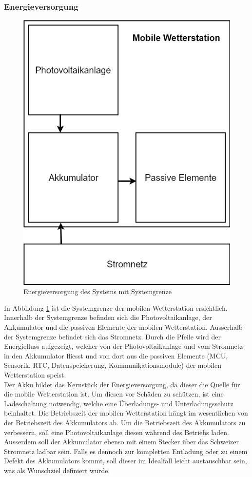 \newpage
\subsubsection{Energieversorgung}
\begin{figure}[h]
\centering
\includegraphics[scale=0.5]{graphics/Konzeptdiagramme/Energieversorgung_1.PNG}
\caption{Energieversorgung des Systems mit Systemgrenze}
\label{fig:Energieversorgung_1}
\end{figure}
In Abbildung \ref{fig:Energieversorgung_1} ist die Systemgrenze der mobilen Wetterstation ersichtlich. Innerhalb der Systemgrenze befinden sich die Photovoltaikanlage, der Akkumulator und die passiven Elemente der mobilen Wetterstation. Ausserhalb der Systemgrenze befindet sich das Stromnetz. Durch die Pfeile wird der Energiefluss aufgezeigt, welcher von der Photovoltaikanlage und vom Stromnetz in den Akkumulator fliesst und von dort aus die passiven Elemente (MCU, Sensorik, RTC, Datenspeicherung, Kommunikationsmodule) der mobilen Wetterstation speist.\\
Der Akku bildet das Kernstück der Energieversorgung, da dieser die Quelle für die mobile Wetterstation ist. Um diesen vor Schäden zu schützen, ist eine Ladeschaltung notwendig, welche eine Überladungs- und Unterladungsschutz beinhaltet. Die Betriebszeit der mobilen Wetterstation hängt im wesentlichen von der Betriebszeit des Akkumulators ab. Um die Betriebszeit des Akkumulators zu verbessern, soll eine Photovoltaikanlage diesen während des Betriebs laden. Ausserdem soll der Akkumulator ebenso mit einem Stecker über das Schweizer Stromnetz ladbar sein. Falls es dennoch zur kompletten Entladung oder zu einem Defekt des Akkumulators kommt, soll dieser im Idealfall leicht austauschbar sein, was als Wunschziel definiert wurde.\\
